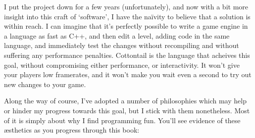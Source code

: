 I put the project down for a few years (unfortunately), and now with a
bit more insight into this craft of `software', I have the naïvity to
believe that a solution is within reach. I can imagine that it's
perfectly possible to write a game engine in a language as fast as
C++, and then edit a level, adding code in the same language, and
immediately test the changes without recompiling and without suffering
any performance penalties. Cottontail is the language that acheives
this goal, without compromising either performance, or interactivity.
It won't give your players low framerates, and it won't make you wait
even a second to try out new changes to your game.

Along the way of course, I've adopted a number of philosophies which
may help or hinder my progress towards this goal, but I stick with
them nonetheless. Most of it is simply about why I find programming
fun. You'll see evidence of these æsthetics as you progress through
this book:

